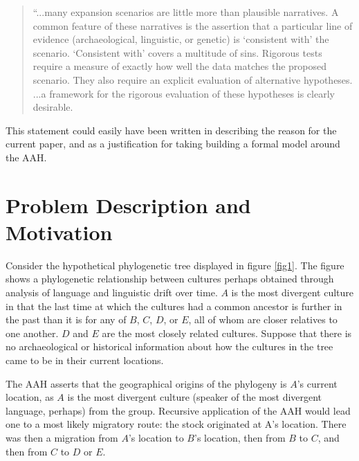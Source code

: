 \documentclass[11pt]{article}
\begin{document}
\begin{quote}
``...many expansion scenarios are little more than plausible narratives. A common feature of these narratives is the assertion that a particular line of evidence (archaeological, linguistic, or genetic) is `consistent with' the scenario. `Consistent with' covers a multitude of sins. Rigorous tests require a measure of exactly how well the data matches the proposed scenario. They also require an explicit evaluation of alternative hypotheses. ...a framework for the rigorous evaluation of these hypotheses is clearly desirable. \citep[p. 31]{greenhill05} 
\end{quote}
This statement could easily have been written in describing the reason for the current paper, and as a justification for taking building a formal model around the AAH.

 


\section{Problem Description and Motivation}

Consider the hypothetical phylogenetic tree displayed in figure \ref{fig1}. The figure shows a phylogenetic relationship between cultures perhaps obtained through analysis of language and linguistic drift over time. $A$ is the most divergent culture in that the last time at which the cultures had a common ancestor is further in the past than it is for any of $B$, $C$, $D$, or $E$, all of whom are closer relatives to one another. $D$ and $E$ are the most closely related cultures. Suppose that there is no archaeological or historical information about how the cultures in the tree came to be in their current locations.

The AAH asserts that the geographical origins of the phylogeny is $A$'s current location, as $A$  is the most divergent culture (speaker of the most divergent language, perhaps) from the group. Recursive application of the AAH would lead one to a most likely migratory route: the stock originated at A's location. There was then a migration from $A$'s location to $B$'s location, then from $B$ to $C$, and then from $C$ to $D$ or $E$.  
\end{document}
